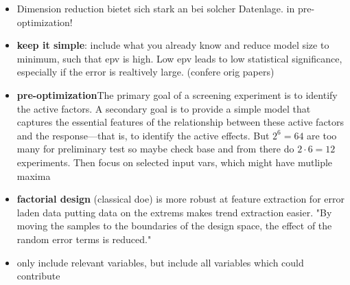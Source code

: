\begin{itemize}
    \item Dimension reduction bietet sich stark an bei solcher Datenlage. in pre-optimization!
    \item \textbf{keep it simple}: include what you already know and reduce model size to minimum, such that \gls{epv} is high.  Low \gls{epv} leads to low statistical significance, especially if the error is realtively large. (confere orig papers)
    \item \textbf{pre-optimization}{The primary goal of a screening experiment is to identify the active factors. A secondary goal is to provide a simple model that captures the essential features of the relationship between these active factors and the response—that is, to identify the active effects. \cite{miller2001using}} But $2^6=64$ are too many for preliminary test so maybe check base and from there do $2\cdot6=12$ experiments. Then focus on selected input vars, which might have mutliple maxima \\ 
    \item \textbf{factorial design} (classical \gls{doe}) is more robust at feature extraction for error laden data \cite{giunta2003overview} putting data on the extrems makes trend extraction easier. "By moving the samples to the boundaries of the design space, the effect of the random error terms is reduced."
    \item only include relevant variables\cite{gunst2009fractional}, but include all variables which could contribute\cite{haertler2014statistisch}

\end{itemize}
